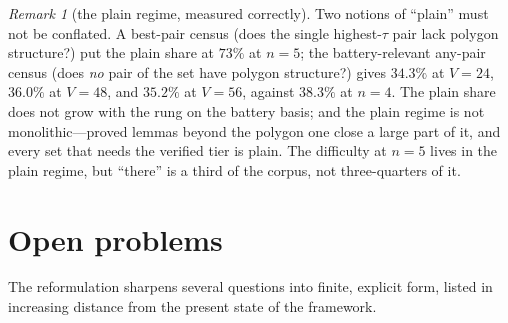 \documentclass[11pt,a4paper]{article}
\numberwithin{equation}{section}
\theoremstyle{plain}
\theoremstyle{plain}
\theoremstyle{definition}
\theoremstyle{remark}
\newtheorem{remark}[theorem]{Remark}
\begin{document}
\begin{remark}[the plain regime, measured correctly]\label{rem:plain}
Two notions of ``plain'' must not be conflated. A best-pair census (does
the single highest-$\tau$ pair lack polygon structure?) put the plain
share at $73\%$ at $n=5$; the battery-relevant any-pair census (does
\emph{no} pair of the set have polygon structure?) gives
$34.3\%$ at $V=24$, $36.0\%$ at $V=48$, and $35.2\%$ at $V=56$, against
$38.3\%$ at $n=4$.
The plain share does not grow with the rung on the battery basis; and
the plain regime is not monolithic---proved lemmas beyond the polygon one
close a large part of it, and every set that needs the verified tier is
plain. The difficulty at $n=5$ lives in the plain regime, but ``there''
is a third of the corpus, not three-quarters of it.
\end{remark}


\section{Open problems}\label{sec:open}

The reformulation sharpens several questions into finite, explicit form,
listed in increasing distance from the present
state of the framework.
\end{document}
